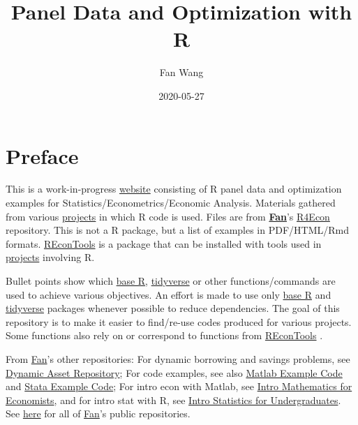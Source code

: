 \documentclass[
]{book}
\title{Panel Data and Optimization with R}
\author{Fan Wang}
\date{2020-05-27}
\begin{document}
\maketitle

{
\hypersetup{linkcolor=}
\setcounter{tocdepth}{1}
\tableofcontents
}
\hypertarget{preface}{%
\chapter*{Preface}\label{preface}}

This is a work-in-progress \href{https://fanwangecon.github.io/R4Econ/}{website} consisting of R panel data and optimization examples for Statistics/Econometrics/Economic Analysis. Materials gathered from various \href{https://fanwangecon.github.io/research}{projects} in which R code is used. Files are from \href{https://fanwangecon.github.io/}{\textbf{Fan}}'s \href{https://github.com/FanWangEcon/R4Econ}{R4Econ} repository. This is not a R package, but a list of examples in PDF/HTML/Rmd formats. \href{https://fanwangecon.github.io/REconTools/}{REconTools} is a package that can be installed with tools used in \href{https://fanwangecon.github.io/research}{projects} involving R.

Bullet points show which \href{https://www.rdocumentation.org/packages/base/versions/3.5.2}{base R}, \href{https://www.tidyverse.org/}{tidyverse} or other functions/commands are used to achieve various objectives. An effort is made to use only \href{https://www.rdocumentation.org/packages/base/versions/3.5.2}{base R} \citep{R-base} and \href{https://www.tidyverse.org/}{tidyverse} \citep{R-tidyverse} packages whenever possible to reduce dependencies. The goal of this repository is to make it easier to find/re-use codes produced for various projects. Some functions also rely on or correspond to functions from \href{https://fanwangecon.github.io/REconTools/}{REconTools} \citep{R-REconTools}.

From \href{https://fanwangecon.github.io/}{Fan}'s other repositories: For dynamic borrowing and savings problems, see \href{https://fanwangecon.github.io/CodeDynaAsset/}{Dynamic Asset Repository}; For code examples, see also \href{https://fanwangecon.github.io/M4Econ/}{Matlab Example Code} and \href{https://fanwangecon.github.io/Stata4Econ/}{Stata Example Code}; For intro econ with Matlab, see \href{https://fanwangecon.github.io/Math4Econ/}{Intro Mathematics for Economists}, and for intro stat with R, see \href{https://fanwangecon.github.io/Stat4Econ/}{Intro Statistics for Undergraduates}. See \href{https://github.com/FanWangEcon}{here} for all of \href{https://fanwangecon.github.io/}{Fan}'s public repositories.
\end{document}
